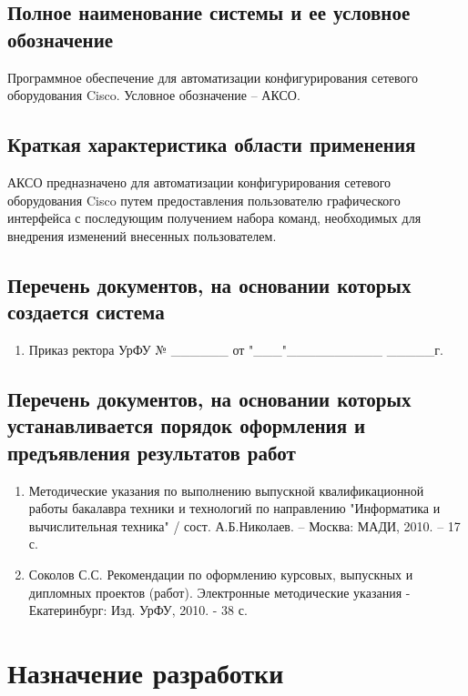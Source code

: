 \documentclass[a4paper,14pt]{extreport}
\begin{document}
	\subsection{Полное наименование системы и ее условное обозначение}
	
	Программное обеспечение для автоматизации конфигурирования сетевого оборудования Cisco. Условное обозначение – АКСО\cite{gost-19.201-78}.
	
	\subsection{Краткая характеристика области применения}
	
	АКСО предназначено для автоматизации конфигурирования сетевого оборудования Cisco путем предоставления пользователю графического интерфейса с последующим получением набора команд, необходимых для внедрения изменений внесенных пользователем.
	
	\subsection{Перечень документов, на основании которых создается система}
	
	\begin{enumerate}
		\item Приказ ректора УрФУ № \_\_\_\_\_\_ от "\_\_\_"\_\_\_\_\_\_\_\_\_\_ \_\_\_\_\_г.
	\end{enumerate}
		
	\subsection{Перечень документов, на основании которых устанавливается порядок оформления и предъявления результатов работ}
	
	\begin{enumerate}
		\item  Методические указания по выполнению выпускной квалификационной работы бакалавра техники и технологий по направлению "Информатика и вычислительная техника" / сост. А.Б.Николаев. – Москва: МАДИ, 2010. – 17 с.
		\item Соколов С.С. Рекомендации по оформлению курсовых, выпускных и дипломных проектов (работ). Электронные методические указания - Екатеринбург: Изд. УрФУ, 2010. - 38 с.
	\end{enumerate}
	
	
	\section{Назначение разработки}
	
\end{document}
